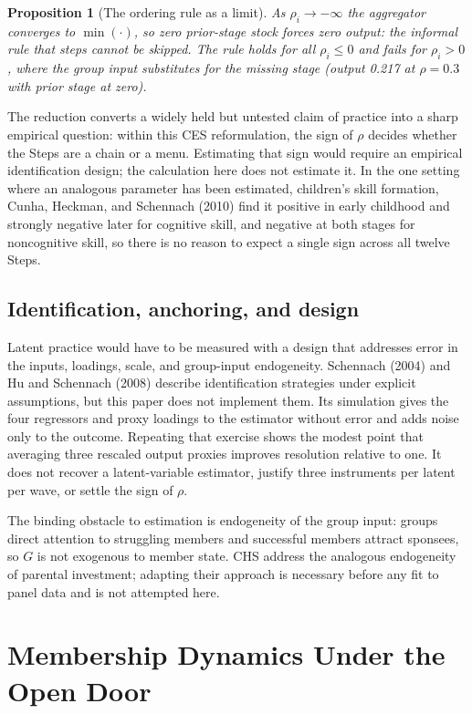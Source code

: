 \documentclass[11pt,a4paper]{article}
\newtheorem{proposition}{Proposition}
\begin{document}
\begin{proposition}[The ordering rule as a limit]
As $\rho_i \to -\infty$ the aggregator converges to $\min(\cdot)$, so zero
prior-stage stock forces zero output: the informal rule that steps cannot be
skipped. The rule holds for all $\rho_i \le 0$ and fails for $\rho_i > 0$, where
the group input substitutes for the missing stage (output 0.217 at $\rho = 0.3$
with prior stage at zero).
\end{proposition}

The reduction converts a widely held but untested claim of practice into a sharp
empirical question: within this CES reformulation, the sign of $\rho$ decides
whether the Steps are a chain or a menu. Estimating that sign would require an
empirical identification design; the calculation here does not estimate it. In the one
setting where an analogous parameter has been estimated, children's skill formation, Cunha,
Heckman, and Schennach (2010) find it positive in early childhood and strongly negative later
for cognitive skill, and negative at both stages for noncognitive skill, so there is no reason
to expect a single sign across all twelve Steps.

\subsection{Identification, anchoring, and design}

Latent practice would have to be measured with a design that addresses error in
the inputs, loadings, scale, and group-input endogeneity. Schennach (2004) and Hu
and Schennach (2008) describe identification strategies under explicit
assumptions, but this paper does not implement them. Its simulation gives the four
regressors and proxy loadings to the estimator without error and adds noise only
to the outcome. Repeating that exercise shows the modest point that averaging
three rescaled output proxies improves resolution relative to one. It does not
recover a latent-variable estimator, justify three instruments per latent per
wave, or settle the sign of $\rho$.

The binding obstacle to estimation is endogeneity of the group input: groups
direct attention to struggling members and successful members attract sponsees, so
$G$ is not exogenous to member state. CHS address the analogous endogeneity of
parental investment; adapting their approach is necessary before any fit to panel
data and is not attempted here.

\section{Membership Dynamics Under the Open Door}
\end{document}
